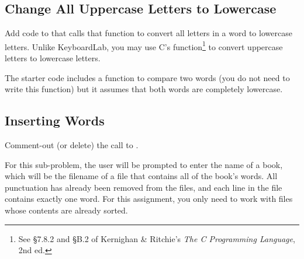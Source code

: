 \subsection{Change All Uppercase Letters to Lowercase}

Add code to  that calls that function to convert all letters in a word to lowercase letters.
Unlike KeyboardLab, you may use C's  function\footnote{See \S7.8.2 and \S{}B.2 of Kernighan \& Ritchie's \textit{The C Programming Language}, 2nd ed.} to convert uppercase letters to lowercase letters.



The starter code includes a function to compare two words (you do not need to write this function) but it assumes that both words are completely lowercase.

%
%

\subsection{Inserting Words} \label{subsec:inserting-words}

Comment-out (or delete) the call to .

For this sub-problem, the user will be prompted to enter the name of a book, which will be the filename of a file that contains all of the book's words.
All punctuation has already been removed from the files, and each line in the file contains exactly one word.
For this assignment, you only need to work with files whose contents are already sorted.



